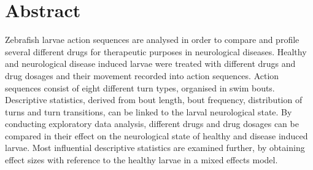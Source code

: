 \documentclass[a4paper,12pt]{article}
\begin{document}
\section*{Abstract}
Zebrafish larvae action sequences are analysed in order to compare and profile several different drugs for therapeutic purposes in neurological diseases. Healthy and neurological disease induced larvae were treated with different drugs and drug dosages and their movement recorded into action sequences. Action sequences consist of eight different turn types, organised in swim bouts. Descriptive statistics, derived from bout length, bout frequency, distribution of turns and turn transitions, can be linked to the larval neurological state. By conducting exploratory data analysis, different drugs and drug dosages can be compared in their effect on the neurological state of healthy and disease induced larvae. Most influential descriptive statistics are examined further, by obtaining effect sizes with reference to the healthy larvae in a mixed effects model.
\phantom{p}
\vfill

\newpage

\tableofcontents
\listoffigures 
\listoftables

\newpage
\end{document}

